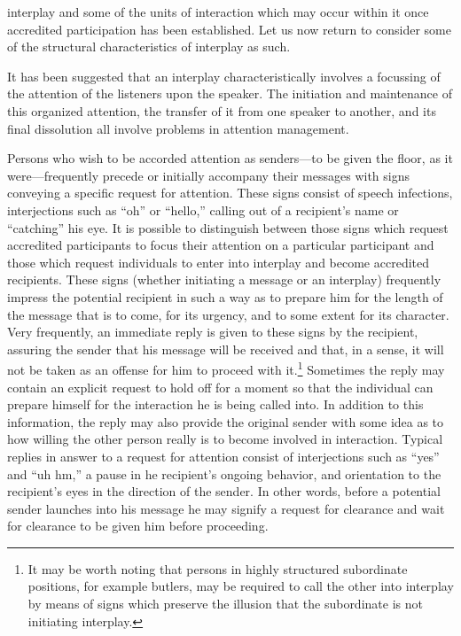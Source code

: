 \documentclass[twoside,symmetric,nobib,justified]{tufte-book}
\begin{document}
 interplay and some of the units of interaction
which may occur within it once accredited participation has been
established. Let us now return to consider some of the structural
characteristics of interplay as such.

It has been suggested that an interplay characteristically involves a
focussing of the attention of the listeners upon the speaker. The
initiation and maintenance of this organized attention, the transfer of
it from one speaker to another, and its final dissolution all involve
problems in attention management.

Persons who wish to be accorded attention as senders---to be given the
floor, as it were---frequently precede or initially accompany their
messages with signs conveying a specific request for attention. These
signs consist of speech infections, interjections such as ``oh'' or
``hello,'' calling out of a recipient's name or ``catching'' his eye. It
is possible to distinguish between those signs which request accredited
participants to focus their attention on a particular participant and
those which request individuals to enter into interplay and become
accredited recipients. These signs (whether initiating a message or an
interplay) frequently impress the potential recipient in such a way as
to prepare him for the length of the message that is to come, for its
urgency, and to some extent for its character. Very frequently, an
immediate reply is given to these signs by the recipient, assuring the
sender that his message will be received and that, in a sense, it will
not be taken as an offense for him to proceed with it.\footnote{It may
  be worth noting that persons in highly structured subordinate
  positions, for example butlers, may be required to call the other into
  interplay by means of signs which preserve the illusion that the
  subordinate is not initiating interplay.} Sometimes the reply may
contain an explicit request to hold off for a moment so that the
individual can prepare himself for the interaction he is being called
into. In addition to this information, the reply may also provide the
original sender with some idea as to how willing the other person really
is to become involved in interaction. Typical replies in answer to a
request for attention consist of interjections such as ``yes'' and ``uh
hm,'' a pause in he recipient's ongoing behavior, and orientation to the
recipient's eyes in the direction of the sender. In other words, before
a potential sender launches into his message he may signify a request
for clearance and wait for clearance to be given him before proceeding.
\end{document}
